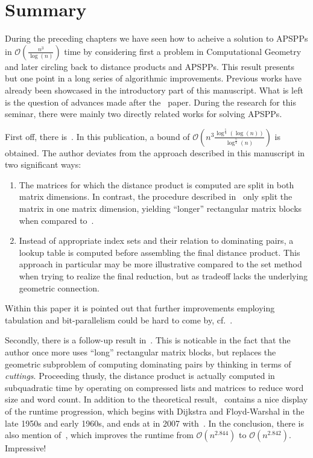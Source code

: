 \chapter{Summary}\label{chap:summary}

During the preceding chapters we have seen how to acheive a solution to APSPPs in $\mathcal{O}\left( \frac{n^3}{\log(n)} \right)$ time by considering first a problem in Computational Geometry and later circling back to distance products and APSPPs.
This result presents but one point in a long series of algorithmic improvements.
Previous works have already been showcased in the introductory part of this manuscript.
What is left is the question of advances made after the~\cite{Chan2007} paper.
During the research for this seminar, there were mainly two directly related works for solving APSPPs.

First off, there is~\cite{Han2008}.
In this publication, a bound of $\mathcal{O}\left( n^3 {\frac{\log^{\frac{5}{4}}(\log(n))}{\log^{\frac{5}{4}}(n)}} \right)$ is obtained.
The author deviates from the approach described in this manuscript in two significant ways:
\begin{enumerate}
    \item %
        The matrices for which the distance product is computed are split in both matrix dimensions.
        In contrast, the procedure described in~\cite{Chan2007} only split the matrix in one matrix dimension, yielding ``longer'' rectangular matrix blocks when compared to~\cite{Han2008}.
    \item %
        Instead of appropriate index sets and their relation to dominating pairs, a lookup table is computed before assembling the final distance product.
        This approach in particular may be more illustrative compared to the set method when trying to realize the final reduction, but as tradeoff lacks the underlying geometric connection.
\end{enumerate}
Within this paper it is pointed out that further improvements employing tabulation and bit-parallelism could be hard to come by, cf.~\cite[Section~6]{Han2008}.

Secondly, there is a follow-up result in~\cite{Chan2010}.
This is noticable in the fact that the author once more uses ``long'' rectangular matrix blocks, but replaces the geometric subproblem of computing dominating pairs by thinking in terms of \emph{cuttings}.
Proceeding thusly, the distance product is actually computed in subquadratic time by operating on compressed lists and matrices to reduce word size and word count.
In addition to the theoretical result,\ \cite[Table~1.1]{Chan2010} contains a nice display of the runtime progression, which begins with Dijkstra and Floyd-Warshal in the late 1950s and early 1960s, and ends at in 2007 with~\cite{Chan2010}.
In the conclusion, there is also mention of~\cite{Yuster2009}, which improves the runtime from $\mathcal{O}\left( n^{2.844} \right)$ to $\mathcal{O}\left( n^{2.842} \right)$.
Impressive!

